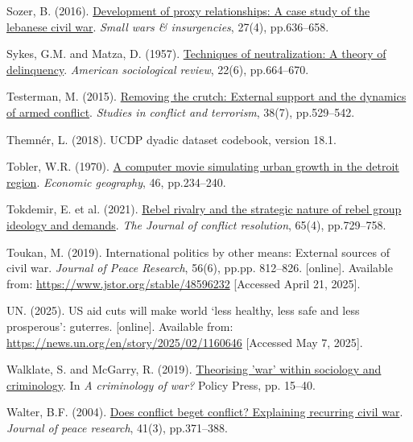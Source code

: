 \documentclass[
]{article}
\newlength{\cslhangindent}
\newenvironment{CSLReferences}[2] %
 {\begin{list}{}{%
  \setlength{\itemindent}{0pt}
  \setlength{\leftmargin}{0pt}
  \setlength{\parsep}{0pt}
  \ifodd #1
   \setlength{\leftmargin}{\cslhangindent}
   \setlength{\itemindent}{-1\cslhangindent}
  \fi
  \setlength{\itemsep}{#2\baselineskip}}}
 {\end{list}}
\begin{document}
\begin{CSLReferences}{0}{1}
Sozer, B. (2016).
\href{https://doi.org/10.1080/09592318.2016.1189495}{Development of
proxy relationships: A case study of the lebanese civil war}.
\emph{Small wars \& insurgencies}, 27(4), pp.636--658.

Sykes, G.M. and Matza, D. (1957).
\href{https://doi.org/10.2307/2089195}{Techniques of neutralization: A
theory of delinquency}. \emph{American sociological review}, 22(6),
pp.664--670.

Testerman, M. (2015).
\href{https://doi.org/10.1080/1057610X.2015.1016312}{Removing the
crutch: External support and the dynamics of armed conflict}.
\emph{Studies in conflict and terrorism}, 38(7), pp.529--542.

Themnér, L. (2018). UCDP dyadic dataset codebook, version 18.1.

Tobler, W.R. (1970). \href{https://doi.org/10.2307/143141}{A computer
movie simulating urban growth in the detroit region}. \emph{Economic
geography}, 46, pp.234--240.

Tokdemir, E. et al. (2021).
\href{https://doi.org/10.1177/0022002720967411}{Rebel rivalry and the
strategic nature of rebel group ideology and demands}. \emph{The Journal
of conflict resolution}, 65(4), pp.729--758.

Toukan, M. (2019). International politics by other means: External
sources of civil war. \emph{Journal of Peace Research}, 56(6), pp.pp.
812--826. {[}online{]}. Available from:
\url{https://www.jstor.org/stable/48596232} {[}Accessed April 21,
2025{]}.

UN. (2025). US aid cuts will make world {`less healthy, less safe and
less prosperous'}: guterres. {[}online{]}. Available from:
\url{https://news.un.org/en/story/2025/02/1160646} {[}Accessed May 7,
2025{]}.

Walklate, S. and McGarry, R. (2019).
\href{https://doi.org/10.51952/9781529202618.ch002}{Theorising 'war'
within sociology and criminology}. In \emph{A criminology of war?}
Policy Press, pp. 15--40.

Walter, B.F. (2004).
\href{https://doi.org/10.1177/0022343304043775}{Does conflict beget
conflict? Explaining recurring civil war}. \emph{Journal of peace
research}, 41(3), pp.371--388.

\end{CSLReferences}
\end{document}
